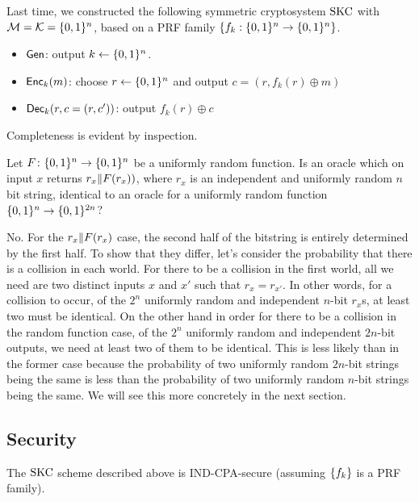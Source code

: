 \documentclass[11pt]{article}
\begin{document}
Last time, we constructed the following symmetric cryptosystem $\text{SKC}$
with $\mathcal{M} = \mathcal{K} = \{0,1\}^{n}$, based on a PRF family
$\{f_{k} : \{0,1\}^{n} \to \{0,1\}^{n}\}$.

\begin{itemize}
\item $\mathsf{Gen}$: output $k \gets \{0,1\}^{n}$.
\item $\mathsf{Enc}_{k}(m)$: choose $r \gets \{0,1\}^{n}$ and output $c = (r,
  f_{k}(r) \oplus m)$
\item $\mathsf{Dec}_{k}(r, c = (r,c'))$: output $f_{k}(r) \oplus c$
\end{itemize}
Completeness is evident by inspection.

\begin{question}
  Let \(F \colon \{0,1\}^n \to \{0,1\}^n\) be a uniformly random
  function. Is an oracle which on input \(x\) returns
  \(r_x \| F(r_x))\), where \(r_x\) is an independent and
  uniformly random $n$ bit string, identical to an oracle for a
  uniformly random function \(\{0,1\}^n \to \{0,1\}^{2n}\)?
\end{question}

\begin{answer}
  No. For the \(r_x \| F(r_x)\) case, the second half of the
  bitstring is entirely determined by the first half. To show that
  they differ, let's consider the probability that there is a
  collision in each world. For there to be a collision in the first
  world, all we need are two distinct inputs \(x\) and \(x'\) such
  that \(r_x = r_{x'}\). In other words, for a collision to occur, of
  the \(2^n\) uniformly random and independent \(n\)-bit \(r_x\)s, at
  least two must be identical. On the other hand in order for there to
  be a collision in the random function case, of the \(2^n\) uniformly
  random and independent \(2n\)-bit outputs, we need at least two of
  them to be identical. This is less likely than in the former case
  because the probability of two uniformly random \(2n\)-bit strings
  being the same is less than the probability of two uniformly random
  \(n\)-bit strings being the same. We will see this more concretely
  in the next section.
\end{answer}

\subsection{Security}
\label{sec:security}

\begin{theorem}
  The $\text{SKC}$ scheme described above is IND-CPA-secure (assuming
  $\{f_{k}\}$ is a PRF family).
\end{theorem}
\end{document}
